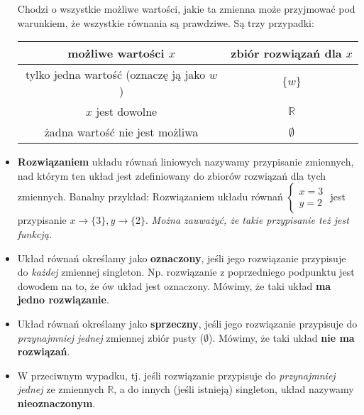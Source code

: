 \documentclass{article}
\theoremstyle{remark}
\begin{document}
\begin{itemize}
  Chodzi o wszystkie możliwe wartości, jakie ta zmienna może przyjmować 
  pod warunkiem, że wszystkie równania są prawdziwe.
  Są trzy przypadki:
  \begin{center}
    \begin{tabular}{|c|c|}
      \hline
      możliwe wartości $x$ &zbiór rozwiązań dla $x$\\
      \hline\hline
      tylko jedna wartość (oznaczę ją jako $w$) & $\{w\}$\\
      \hline
      $x$ jest dowolne & $\mathbb R$\\
      \hline
      żadna wartość nie jest możliwa & $\emptyset$\\
      \hline
    \end{tabular}
  \end{center}
  
  \item \textbf{Rozwiązaniem} układu równań liniowych nazywamy 
  przypisanie zmiennych, nad którym ten układ jest zdefiniowany do 
  zbiorów rozwiązań dla tych zmiennych. Banalny przykład:
  Rozwiązaniem układu równań $
    \left\{ 
      \begin{array}{l}
        x=3\\
        y=2
      \end{array}
    \right.$ jest przypisanie $x \to \{3\}, y \to \{2\}$.
  \textit{Można zauważyć, że takie przypisanie też jest funkcją.}
  
  \item Układ równań określamy jako \textbf{oznaczony}, jeśli jego
  rozwiązanie przypisuje do \textit{każdej} zmiennej singleton.
  Np. rozwiązanie z poprzedniego podpunktu jest dowodem na to, że ów układ
  jest oznaczony. Mówimy, że taki układ \textbf{ma jedno rozwiązanie}.
  \item Układ równań określamy jako \textbf{sprzeczny}, jeśli jego
  rozwiązanie przypisuje do \textit{przynajmniej jednej} zmiennej zbiór pusty ($\emptyset$).
  Mówimy, że taki układ \textbf{nie ma rozwiązań}.
  \item W przeciwnym wypadku, tj. jeśli rozwiązanie przypisuje do 
  \textit{przynajmniej jednej} ze zmiennych $\mathbb R$, 
  a do innych (jeśli istnieją) singleton,
  układ nazywamy \textbf{nieoznaczonym}.
\end{itemize}
\end{document}
